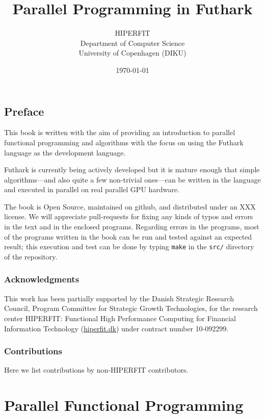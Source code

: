 \documentclass[11pt]{book}
\title{\bf Parallel Programming in Futhark}
\author{HIPERFIT \\ Department of Computer Science \\ University of Copenhagen (DIKU)}
\date{\today}
\begin{document}
\frontmatter
\maketitle
\chapter{Preface}

This book is written with the aim of providing an introduction to
parallel functional programming and algorithms with the focus on using
the Futhark language as the development language.

Futhark is currently being actively developed but it is mature enough
that simple algorithms---and also quite a few non-trivial ones---can
be written in the language and executed in parallel on real parallel
GPU hardware.

The book is Open Source, maintained on github, and distributed under
an XXX license. We will appreciate pull-requests for fixing any kinds
of typos and errors in the text and in the enclosed
programs. Regarding errors in the programs, most of the programs
written in the book can be run and tested against an expected result;
this execution and test can be done by typing \texttt{make} in the
\texttt{src/} directory of the repository.

\section*{Acknowledgments}
This work has been partially supported by the Danish Strategic Research
Council, Program Committee for Strategic Growth Technologies, for the
research center HIPERFIT: Functional High Performance Computing for
Financial Information Technology (\url{hiperfit.dk}) under contract number
10-092299.

\section*{Contributions}
Here we list contributions by non-HIPERFIT contributors.


\tableofcontents
\mainmatter
\part{Parallel Functional Programming}
\end{document}
